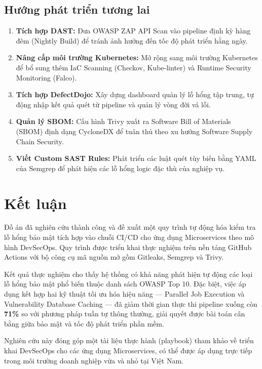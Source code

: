 \documentclass[12pt,a4paper]{report}
\begin{document}
\subsection{Hướng phát triển tương lai}

\begin{enumerate}[leftmargin=2cm]
    \item \textbf{Tích hợp DAST:} Đưa OWASP ZAP API Scan vào pipeline định kỳ hàng đêm (Nightly Build) để tránh ảnh hưởng đến tốc độ phát triển hằng ngày.
    \item \textbf{Nâng cấp môi trường Kubernetes:} Mở rộng sang môi trường Kubernetes để bổ sung thêm IaC Scanning (Checkov, Kube-linter) và Runtime Security Monitoring (Falco).
    \item \textbf{Tích hợp DefectDojo:} Xây dựng dashboard quản lý lỗ hổng tập trung, tự động nhập kết quả quét từ pipeline và quản lý vòng đời vá lỗi.
    \item \textbf{Quản lý SBOM:} Cấu hình Trivy xuất ra Software Bill of Materials (SBOM) định dạng CycloneDX để tuân thủ theo xu hướng Software Supply Chain Security.
    \item \textbf{Viết Custom SAST Rules:} Phát triển các luật quét tùy biến bằng YAML của Semgrep để phát hiện các lỗ hổng logic đặc thù của nghiệp vụ.
\end{enumerate}

\section{Kết luận}

Đồ án đã nghiên cứu thành công và đề xuất một quy trình tự động hóa kiểm tra lỗ hổng bảo mật tích hợp vào chuỗi CI/CD cho ứng dụng Microservices theo mô hình DevSecOps. Quy trình được triển khai thực nghiệm trên nền tảng GitHub Actions với bộ công cụ mã nguồn mở gồm Gitleaks, Semgrep và Trivy.

Kết quả thực nghiệm cho thấy hệ thống có khả năng phát hiện tự động các loại lỗ hổng bảo mật phổ biến thuộc danh sách OWASP Top 10. Đặc biệt, việc áp dụng kết hợp hai kỹ thuật tối ưu hóa hiệu năng --- Parallel Job Execution và Vulnerability Database Caching --- đã giảm thời gian thực thi pipeline xuống còn \textbf{71\%} so với phương pháp tuần tự thông thường, giải quyết được bài toán cân bằng giữa bảo mật và tốc độ phát triển phần mềm.

Nghiên cứu này đóng góp một tài liệu thực hành (playbook) tham khảo về triển khai DevSecOps cho các ứng dụng Microservices, có thể được áp dụng trực tiếp trong môi trường doanh nghiệp vừa và nhỏ tại Việt Nam.
\end{document}
